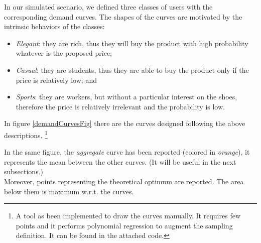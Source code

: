 In our simulated scenario, we defined three classes of users with the corresponding demand curves. The shapes of the curves are motivated by the intrinsic behaviors of the classes:
\begin{itemize}
	\item \textit{Elegant}: they are rich, thus they will buy the product with high probability whatever is the proposed price;
	\item \textit{Casual}: they are students, thus they are able to buy the product only if the price is relatively low; and
	\item \textit{Sports}: they are workers, but without a particular interest on the shoes, therefore the price is relatively irrelevant and the probability is low.
\end{itemize}

In figure \ref{demandCurvesFig} there are the curves designed following the above descriptions.
\footnote{A tool as been implemented to draw the curves manually. It requires few points and it performs polynomial regression to augment the sampling definition. It can be found in the attached code.}

In the same figure, the \textit{aggregate} curve has been reported (colored in \textit{orange}), it represents the mean between the other curves. (It will be useful in the next subsections.)\\
Moreover, points representing the theoretical optimum are reported. The area below them is maximum w.r.t. the curves.

